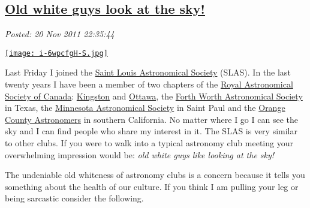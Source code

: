 %

\subsection*{\href{https://bakerjd99.wordpress.com/2011/11/20/old-white-guys-look-at-the-sky/}{Old white guys look at the sky!}}


\noindent\emph{Posted: 20 Nov 2011 22:35:44}
\vspace{6pt}

\captionsetup[floatingfigure]{labelformat=empty}
\begin{floatingfigure}[r]{0.24\textwidth}
\centering
\href{http://www.slasonline.org/}{\texttt{[image: i-6wpcfgH-S.jpg]}}
\label{fig:2151X0}
\end{floatingfigure}Last Friday I joined the \href{http://www.slasonline.org/}{Saint Louis
Astronomical Society} (SLAS). In the last twenty years I have been a
member of two chapters of the \href{http://www.rasc.ca/}{Royal
Astronomical Society of Canada}:
\href{http://kingston.rasc.ca/}{Kingston} and
\href{http://www.ottawa.rasc.ca/}{Ottawa}, the
\href{http://www.fortworthastro.com}{Forth Worth Astronomical Society}
in Texas, the \href{http://www.mnastro.org/}{Minnesota Astronomical
Society} in Saint Paul and the
\href{http://www.ocastronomers.org/}{Orange County Astronomers} in
southern California. No matter where I go I can see the sky and I can
find people who share my interest in it. The SLAS is very similar to
other clubs. If you were to walk into a typical astronomy club meeting
your overwhelming impression would be: \emph{old white guys like looking
at the sky!}

\emph{}The undeniable old whiteness of astronomy clubs is a concern
because it tells you something about the health of our culture. If you
think I am pulling your leg or being sarcastic consider the following.

